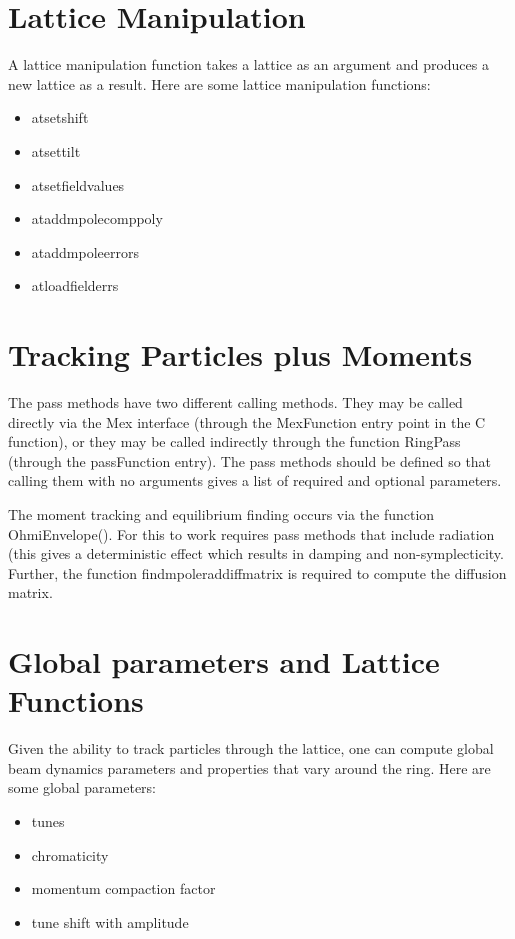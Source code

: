 \documentclass[acus]{article}
\begin{document}
\section{Lattice Manipulation}
A lattice manipulation function takes a lattice as an argument and produces a new lattice as a result.
Here are some lattice manipulation functions:
\begin{itemize}
\item atsetshift
\item atsettilt
\item atsetfieldvalues
\item ataddmpolecomppoly
\item ataddmpoleerrors
\item atloadfielderrs
\end{itemize}


\section{Tracking Particles plus Moments}
The pass methods have two different calling methods.  They may be called directly via the Mex interface (through the MexFunction entry point in the C function), or they may be called indirectly through the function RingPass (through the passFunction entry).  The pass methods should be defined so that calling them with no arguments gives a list of required and optional parameters.

The moment tracking and equilibrium finding occurs via the function OhmiEnvelope().  For this to work requires pass methods that include radiation (this gives a deterministic effect which results in damping and non-symplecticity.  Further, the function findmpoleraddiffmatrix is required to compute the diffusion matrix.

\section{Global parameters and Lattice Functions}
Given the ability to track particles through the lattice, one can compute global beam dynamics parameters and properties that vary around the ring.  
Here are some global parameters:
\begin{itemize}
\item tunes
\item chromaticity
\item momentum compaction factor
\item tune shift with amplitude
\end{itemize}
\end{document}
